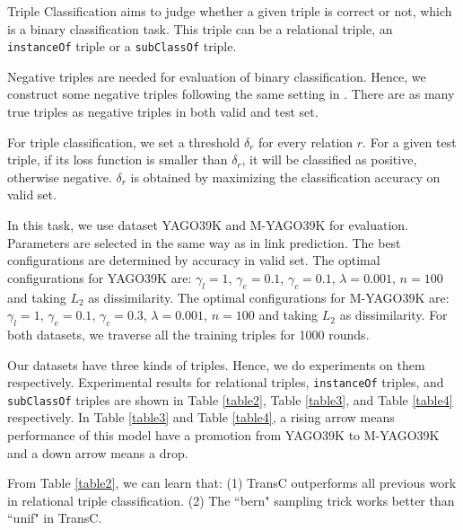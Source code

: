 \documentclass[11pt,a4paper]{article}
\begin{document}
  Triple Classification aims to judge whether a given triple is correct or not, which is a binary classification task. 
  This triple can be a relational triple, an \texttt{instanceOf} triple or a \texttt{subClassOf} triple. 
  
  Negative triples are needed for evaluation of binary classification. Hence, we construct some negative triples 
  following the same setting in \cite{NTN}. There are as many true triples as negative triples in 
  both valid and test set.
  
  For triple classification, we set a threshold $\delta_r$ for every relation $r$. For a given test triple, 
  if its loss function is smaller than $\delta_r$, it will be classified as positive, otherwise negative. $\delta_r$
  is obtained by maximizing the classification accuracy on valid set.
  
  In this task, we use dataset YAGO39K and M-YAGO39K for evaluation.  
  Parameters are selected in the same way as in link prediction.
  The best configurations are determined by accuracy in valid set. The optimal configurations for YAGO39K are:
  $\gamma_l = 1$, $\gamma_e = 0.1$, $\gamma_c = 0.1$, $\lambda = 0.001$, $n = 100$ and taking $L_2$ as dissimilarity.
  The optimal configurations for M-YAGO39K are: $\gamma_l = 1$, $\gamma_e = 0.1$, $\gamma_c = 0.3$, $\lambda = 0.001$, 
  $n = 100$ and taking $L_2$ as dissimilarity. For both datasets, we traverse all the training triples for 1000 rounds.
  
  Our datasets have three kinds of triples. Hence, we do experiments on them respectively. Experimental results
  for relational triples, \texttt{instanceOf} triples, and \texttt{subClassOf} triples are shown in Table \ref{table2}, Table \ref{table3}, and Table \ref{table4} respectively.
  In Table \ref{table3} and Table \ref{table4}, a rising arrow means performance of this model have a promotion from YAGO39K to M-YAGO39K and a down arrow
  means a drop.
  
  From Table \ref{table2}, we can learn that: (1) TransC outperforms all previous work 
  in relational triple classification. (2) The ``bern" sampling trick works better than ``unif" in TransC.
  
\end{document}
